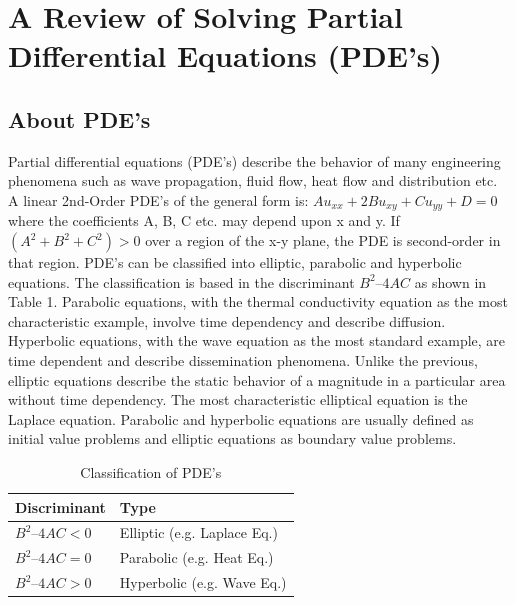 \chapter{A Review of Solving Partial Differential Equations (PDE's)}



\section{About PDE's}

Partial differential equations (PDE's) describe the behavior of many engineering phenomena such as wave propagation, fluid flow, heat flow and distribution etc. A linear 2nd-Order PDE's of the general form is:
$Au_{xx} + 2Bu_{xy} + Cu_{yy} + D = 0$
where the coefficients A, B, C etc.  may depend upon x and y. 
If $(A^2+ B^2+C^2) >0$ over a region of the x-y plane, the PDE is second-order in that region. PDE's can be classified into elliptic, parabolic and hyperbolic equations. The classification is based in the discriminant $B^2 – 4AC$ as shown in Table 1. Parabolic equations, with the thermal conductivity equation as the most characteristic example, involve time dependency and describe diffusion. Hyperbolic equations, with the wave equation as the most standard example, are time dependent
and describe dissemination phenomena. Unlike the previous, elliptic equations describe the static behavior of a magnitude in a particular area without time dependency. The most characteristic elliptical equation is the Laplace equation. Parabolic and hyperbolic equations are usually defined as initial value problems and elliptic equations as boundary value problems.

\begin{table}[h!]
    \begin{center}
        \begin{tabular}{| l | l |}
        \hline
        Discriminant   & Type 	\\ \hline
        $B^2 – 4AC < 0$   & Elliptic (e.g. Laplace Eq.) 	\\ \hline
        $B^2  – 4AC = 0$  &	Parabolic (e.g. Heat Eq.)        \\ \hline
        $B^2 – 4AC > 0$  & Hyperbolic (e.g. Wave Eq.) 	\\ \hline
       
        \end{tabular}
    \end{center}

    \caption{Classification of PDE's}
    \label{table:trainingset}
\end{table}



